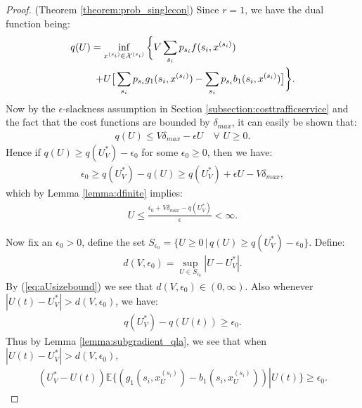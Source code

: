 \documentclass[journal]{IEEEtran}
\newcommand{\expect}[1]{\mathbb{E}\big\{#1\big\}}
\newcommand{\script}[1]{{{\cal{#1} }}}
\begin{document}
\begin{proof} (Theorem \ref{theorem:prob_singlecon})
Since $r=1$, we have the dual function being:
\begin{eqnarray*}
q(U)=\inf_{x^{(s_i)}\in \script{X}^{(s_i)}}\bigg\{ V\sum_{s_i}p_{s_i}f(s_i, x^{(s_i)})\qquad\qquad\qquad\\
+U\big[ \sum_{s_i}p_{s_i}g_1(s_i, x^{(s_i)})- \sum_{s_i}p_{s_i}b_1(s_i, x^{(s_i)})\big]\bigg\}.
\end{eqnarray*}
Now by the $\epsilon$-slackness assumption in Section \ref{subsection:costtrafficservice} and  the fact that the cost functions are bounded by $\delta_{max}$, it can easily be shown that: 
\begin{eqnarray*}
q(U)\leq V\delta_{max} - \epsilon U\quad\forall\,\,U\geq0. 
\end{eqnarray*}
Hence if $q(U)\geq q(U^*_V)-\epsilon_0$ for some $\epsilon_0\geq0$, then we have:
\begin{eqnarray*}
\epsilon_0\geq q(U^*_V)-q(U)\geq q(U^*_V)+\epsilon U-V\delta_{max},
\end{eqnarray*}
which by Lemma \ref{lemma:dfinite} implies:
\begin{eqnarray}
U\leq \frac{\epsilon_0+V\delta_{max}-q(U^*_V)}{\epsilon}<\infty.\label{eq:aUsizebound}
\end{eqnarray}

Now fix an $\epsilon_0>0$, define the set $S_{\epsilon_0}=\{U\geq 0\, |\, q(U) \geq q(U_V^*)-\epsilon_0\}$. Define: 
\begin{eqnarray}
d(V,\epsilon_0)=\sup_{U\in S_{\epsilon_0}} |U-U_V^*|. \label{eq:dv_def}
\end{eqnarray}
By (\ref{eq:aUsizebound}) we see that $d(V,\epsilon_0)\in(0, \infty)$. Also whenever $|U(t)-U^*_V|>d(V,\epsilon_0)$, we have:
\begin{eqnarray}
q(U_V^*)-q(U(t))\geq\epsilon_0.%
\end{eqnarray}
Thus by Lemma \ref{lemma:subgradient_qla}, we see that when $|U(t)-U^*_V|>d(V,\epsilon_0)$,
\begin{eqnarray*}
(U^*_V-U(t))\expect{(g_1(s_i, x^{(s_i)}_{U})-b_1(s_i, x^{(s_i)}_{U}) )\left|\right.U(t)}
\geq\epsilon_0.
\end{eqnarray*}


\end{proof}
\end{document}
